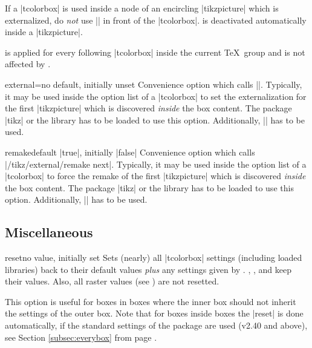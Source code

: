 \begin{marker}
If a |tcolorbox| is used inside a node of an encircling |tikzpicture| which is externalized,
do \emph{not} use |\tikzexternaldisable| in front of the |tcolorbox|.
 is deactivated automatically inside a |tikzpicture|.
\end{marker}

\begin{marker}
 is applied for every following |tcolorbox|
inside the current \TeX\ group and is not affected by .
\end{marker}

\begin{docTcbKey}{external}{=}{no default, initially unset}
  Convenience option which calls ||. Typically,
  it may be used inside the option list of a |tcolorbox| to set the
  externalization  for the first |tikzpicture| which is discovered
  \emph{inside} the box content.
  The package |tikz| \cite{tantau:tikz_and_pgf} or the library  has to be loaded to use this option.
  Additionally, |\usetikzlibrary{external}| has to be used.
\end{docTcbKey}

\begin{docTcbKey}{remake}{}{default |true|, initially |false|}
  Convenience option which calls |/tikz/external/remake next|. Typically,
  it may be used inside the option list of a |tcolorbox| to force the remake
  of the first |tikzpicture| which is discovered \emph{inside} the box content.
  The package |tikz| \cite{tantau:tikz_and_pgf} or the library  has to be loaded to use this option.
  Additionally, |\usetikzlibrary{external}| has to be used.
\end{docTcbKey}


\clearpage
\subsection{Miscellaneous}
\begin{docTcbKey}{reset}{}{no value, initially set}
Sets (nearly) all |tcolorbox| settings (including loaded libraries) back to their default values
\emph{plus} any settings given by .
, , and
 keep their values.
Also, all raster values (see ) are not resetted.

This option is useful for boxes in boxes where the inner box should not inherit
the settings of the outer box.
Note that for boxes inside boxes the |reset| is done automatically, if the
standard settings of the package are used (v2.40 and above), see
Section \ref{subsec:everybox} from page \pageref{subsec:everybox}.
\end{docTcbKey}




